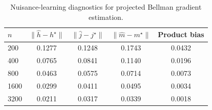 \begin{table}[t]
\centering
\small
\setlength{\tabcolsep}{5pt}
\caption{Nuisance-learning diagnostics for projected Bellman gradient estimation.}
\label{tab:generated-bellman-b1-nuisance}
\begin{tabular}{lcccc}
\toprule
$n$ & $\|\hat h-h^\star\|$ & $\|\hat j-j^\star\|$ & $\|\hat m-m^\star\|$ & Product bias \\
\midrule
200 & 0.1277 & 0.1248 & 0.1743 & 0.0432 \\
400 & 0.0765 & 0.0841 & 0.1140 & 0.0196 \\
800 & 0.0463 & 0.0575 & 0.0714 & 0.0073 \\
1600 & 0.0299 & 0.0411 & 0.0495 & 0.0034 \\
3200 & 0.0211 & 0.0317 & 0.0339 & 0.0018 \\
\bottomrule
\end{tabular}
\end{table}
